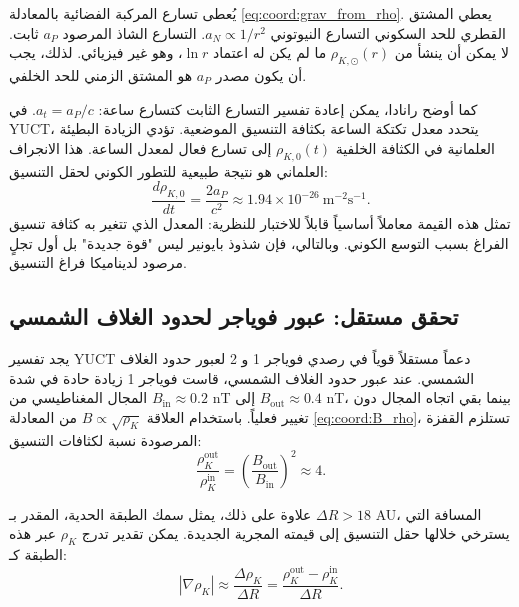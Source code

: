 \documentclass[11pt,a4paper]{article}
\theoremstyle{remark}
\begin{document}
	يُعطى تسارع المركبة الفضائية بالمعادلة \eqref{eq:coord:grav_from_rho}. يعطي المشتق القطري للحد السكوني التسارع النيوتوني \(a_N \propto 1/r^2\). التسارع الشاذ المرصود \(a_P\) ثابت. لا يمكن أن ينشأ من \(\rho_{K,\odot}(r)\) ما لم يكن له اعتماد \(\ln r\)، وهو غير فيزيائي. لذلك، يجب أن يكون مصدر \(a_P\) هو المشتق الزمني للحد الخلفي.
	
	كما أوضح رانادا، يمكن إعادة تفسير التسارع الثابت كتسارع ساعة: \(a_t = a_P / c\). في YUCT، يتحدد معدل تكتكة الساعة بكثافة التنسيق الموضعية. تؤدي الزيادة البطيئة العلمانية في الكثافة الخلفية \(\rho_{K,0}(t)\) إلى تسارع فعال لمعدل الساعة. هذا الانجراف العلماني هو نتيجة طبيعية للتطور الكوني لحقل التنسيق:
	\begin{equation}
		\frac{d\rho_{K,0}}{dt} = \frac{2a_P}{c^2} \approx 1.94 \times 10^{-26}\ \text{m}^{-2}\text{s}^{-1}.
		\label{eq:coord:rho_dot}
	\end{equation}
	تمثل هذه القيمة معاملاً أساسياً قابلاً للاختبار للنظرية: المعدل الذي تتغير به كثافة تنسيق الفراغ بسبب التوسع الكوني. وبالتالي، فإن شذوذ بايونير ليس "قوة جديدة" بل أول تجلٍ مرصود لديناميكا فراغ التنسيق.
	
	\subsection{تحقق مستقل: عبور فوياجر لحدود الغلاف الشمسي}
	\label{subsec:coord:voyager}
	
	يجد تفسير YUCT دعماً مستقلاً قوياً في رصدي فوياجر 1 و 2 لعبور حدود الغلاف الشمسي. عند عبور حدود الغلاف الشمسي، قاست فوياجر 1 زيادة حادة في شدة المجال المغناطيسي من \(B_{\text{in}} \approx 0.2\) nT إلى \(B_{\text{out}} \approx 0.4\) nT، بينما بقي اتجاه المجال دون تغيير فعلياً. باستخدام العلاقة \(B \propto \sqrt{\rho_K}\) من المعادلة \eqref{eq:coord:B_rho}، تستلزم القفزة المرصودة نسبة لكثافات التنسيق:
	\begin{equation}
		\frac{\rho_K^{\text{out}}}{\rho_K^{\text{in}}} = \left( \frac{B_{\text{out}}}{B_{\text{in}}} \right)^2 \approx 4.
		\label{eq:coord:rho_ratio_voyager}
	\end{equation}
	
	علاوة على ذلك، يمثل سمك الطبقة الحدية، المقدر بـ \(\Delta R > 18\) AU، المسافة التي يسترخي خلالها حقل التنسيق إلى قيمته المجرية الجديدة. يمكن تقدير تدرج \(\rho_K\) عبر هذه الطبقة كـ:
	\begin{equation}
		|\nabla \rho_K| \approx \frac{\Delta \rho_K}{\Delta R} = \frac{\rho_K^{\text{out}} - \rho_K^{\text{in}}}{\Delta R}.
		\label{eq:coord:gradient_estimate}
	\end{equation}
	
\end{document}
